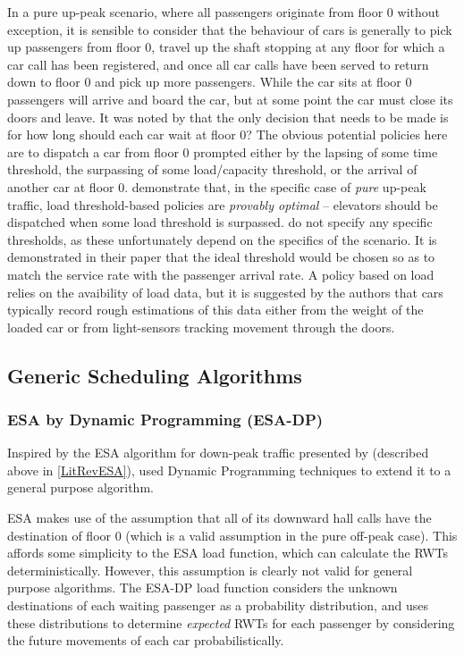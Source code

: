 \documentclass{UoYCSproject}
\begin{document}
In a pure up-peak scenario, where all passengers originate from floor 0 without exception, it is sensible to consider that the behaviour of cars is generally to pick up passengers from floor 0, travel up the shaft stopping at any floor for which a car call has been registered, and once all car calls have been served to return down to floor 0 and pick up more passengers.  While the car sits at floor 0 passengers will arrive and board the car, but at some point the car must close its doors and leave.  It was noted by \citet{Pepyne1997} that the only decision that needs to be made is for how long should each car wait at floor 0?  The obvious potential policies here are to dispatch a car from floor 0 prompted either by the lapsing of some time threshold, the surpassing of some load/capacity threshold, or the arrival of another car at floor 0.  \citet{Pepyne1997} demonstrate that, in the specific case of \textit{pure} up-peak traffic, load threshold-based policies are \textit{provably optimal} -- elevators should be dispatched when some load threshold is surpassed.  \citet{Pepyne1997} do not specify any specific thresholds, as these unfortunately depend on the specifics of the scenario.  It is demonstrated in their paper that the ideal threshold would be chosen so as to match the service rate with the passenger arrival rate.  A policy based on load relies on the avaibility of load data, but it is suggested by the authors that cars typically record rough estimations of this data either from the weight of the loaded car or from light-sensors tracking movement through the doors.

\subsection{Generic Scheduling Algorithms}

\subsubsection{ESA by Dynamic Programming (ESA-DP) \citep{Nikovski2003}}
\label{LitRevESADP}

Inspired by the ESA algorithm for down-peak traffic presented by \citet{Bao1994} (described above in \autoref{LitRevESA}), \citet{Nikovski2003} used Dynamic Programming techniques to extend it to a general purpose algorithm.

ESA makes use of the assumption that all of its downward hall calls have the destination of floor 0 (which is a valid assumption in the pure off-peak case).  This affords some simplicity to the ESA load function, which can calculate the RWTs deterministically.  However, this assumption is clearly not valid for general purpose algorithms.  The ESA-DP load function considers the unknown destinations of each waiting passenger as a probability distribution, and uses these distributions to determine \textit{expected} RWTs for each passenger by considering the future movements of each car probabilistically.
\end{document}
